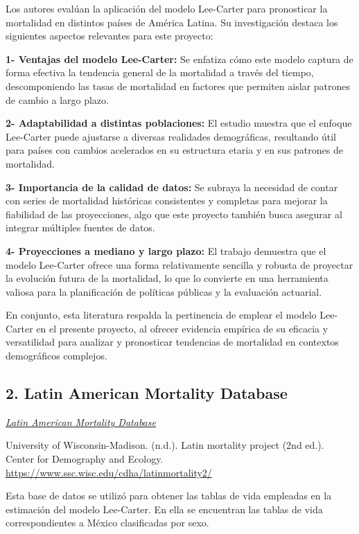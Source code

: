 \documentclass[
]{article}
\begin{document}
Los autores evalúan la aplicación del modelo Lee-Carter para pronosticar
la mortalidad en distintos países de América Latina. Su investigación
destaca los siguientes aspectos relevantes para este proyecto:

\textbf{1- Ventajas del modelo Lee-Carter:} Se enfatiza cómo este modelo
captura de forma efectiva la tendencia general de la mortalidad a través
del tiempo, descomponiendo las tasas de mortalidad en factores que
permiten aislar patrones de cambio a largo plazo.

\textbf{2- Adaptabilidad a distintas poblaciones:} El estudio muestra
que el enfoque Lee-Carter puede ajustarse a diversas realidades
demográficas, resultando útil para países con cambios acelerados en su
estructura etaria y en sus patrones de mortalidad.

\textbf{3- Importancia de la calidad de datos:} Se subraya la necesidad
de contar con series de mortalidad históricas consistentes y completas
para mejorar la fiabilidad de las proyecciones, algo que este proyecto
también busca asegurar al integrar múltiples fuentes de datos.

\textbf{4- Proyecciones a mediano y largo plazo:} El trabajo demuestra
que el modelo Lee-Carter ofrece una forma relativamente sencilla y
robusta de proyectar la evolución futura de la mortalidad, lo que lo
convierte en una herramienta valiosa para la planificación de políticas
públicas y la evaluación actuarial.

En conjunto, esta literatura respalda la pertinencia de emplear el
modelo Lee-Carter en el presente proyecto, al ofrecer evidencia empírica
de su eficacia y versatilidad para analizar y pronosticar tendencias de
mortalidad en contextos demográficos complejos.

\hypertarget{latin-american-mortality-database}{%
\subsection{2. Latin American Mortality
Database}\label{latin-american-mortality-database}}

\href{https://www.ssc.wisc.edu/cdha/latinmortality2/?page_id=28}{\emph{Latin
American Mortality Database}}

University of Wisconsin-Madison. (n.d.). Latin mortality project (2nd
ed.). Center for Demography and Ecology.
\url{https://www.ssc.wisc.edu/cdha/latinmortality2/}

Esta base de datos se utilizó para obtener las tablas de vida empleadas
en la estimación del modelo Lee-Carter. En ella se encuentran las tablas
de vida correspondientes a México clasificadas por sexo.
\end{document}

